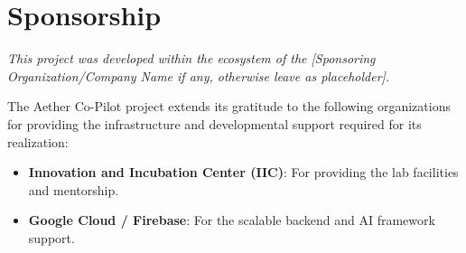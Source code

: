 \chapter*{Sponsorship}
\thispagestyle{roman}

\begin{center}
    \textit{This project was developed within the ecosystem of the [Sponsoring Organization/Company Name if any, otherwise leave as placeholder].}
\end{center}

\vspace{1cm}

The Aether Co-Pilot project extends its gratitude to the following organizations for providing the infrastructure and developmental support required for its realization:

\begin{itemize}
    \item \textbf{Innovation and Incubation Center (IIC)}: For providing the lab facilities and mentorship.
    \item \textbf{Google Cloud / Firebase}: For the scalable backend and AI framework support.
\end{itemize}

\newpage
